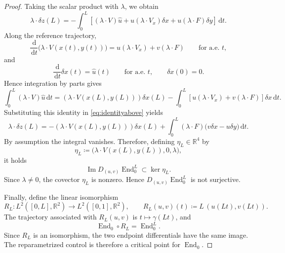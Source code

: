 \documentclass[11pt]{amsart}
\numberwithin{equation}{section}
\theoremstyle{remark}
\newcommand{\R}{\mathbb R}
\newcommand{\dd}{\,\mathrm d}
\newcommand{\End}{\operatorname{End}}
\begin{document}
\begin{proof}
Taking the scalar product with $\lambda$, we obtain
\begin{equation}\label{eq:identityabove}
 \lambda\cdot\delta z(L)
 =
 -\int_0^L
 \left[
 (\lambda\cdot V)\widehat u
 +u(\lambda\cdot V_x)\delta x
 +u(\lambda\cdot F)\delta y
 \right]\dd t.
\end{equation}
Along the reference trajectory,
\begin{equation}
 \frac{\dd}{\dd t}\bigl(\lambda\cdot V(x(t),y(t))\bigr)
 =
 u(\lambda\cdot V_x)+v(\lambda\cdot F)
 \qquad\text{for a.e. }t,
\end{equation}
and
\begin{equation}
 \frac{\dd}{\dd t}\delta x(t)=\widehat u(t)
 \qquad\text{for a.e. }t,
 \qquad
 \delta x(0)=0.
\end{equation}
Hence integration by parts gives
\begin{equation}
 \int_0^L(\lambda\cdot V)\widehat u\dd t
 =
 (\lambda\cdot V(x(L),y(L)))\delta x(L)
 -
 \int_0^L
 \left[
 u(\lambda\cdot V_x)+v(\lambda\cdot F)
 \right]\delta x\dd t.
\end{equation}
Substituting this identity in \eqref{eq:identityabove} yields
\begin{equation}
 \lambda\cdot\delta z(L)
 =
 -(\lambda\cdot V(x(L),y(L)))\delta x(L)
 +
 \int_0^L
 (\lambda\cdot F)
 \bigl(v\delta x-u\delta y\bigr)\dd t.
\end{equation}
By assumption the integral vanishes. Therefore, defining $\eta_L \in \R^4$ by
\begin{equation}
 \eta_L
 \coloneq 
 \bigl(
 \lambda\cdot V(x(L),y(L)), 0, \lambda
 \bigr),
\end{equation}
it holds 
\begin{equation}
 \operatorname{Im}D_{(u,v)}\End_0^L\subset\ker\eta_L.
\end{equation}
Since $\lambda\neq0$, the covector $\eta_L$ is nonzero.  Hence $D_{(u,v)}\End_0^L$ is not surjective.

Finally, define the linear isomorphism
\begin{equation}
 R_L:L^2([0,L],\R^2)\longrightarrow L^2([0,1],\R^2),
 \qquad
 R_L(u,v)(t)\coloneq L\,(u(Lt),v(Lt)).
\end{equation}
The trajectory associated with $R_L(u,v)$ is $t\mapsto\gamma(Lt)$, and
\begin{equation}
 \End_0\circ R_L=\End_0^L.
\end{equation}
Since $R_L$ is an isomorphism, the two endpoint differentials have the
same image.  The reparametrized control is therefore a critical point for
$\End_0$.
\end{proof}
\end{document}
